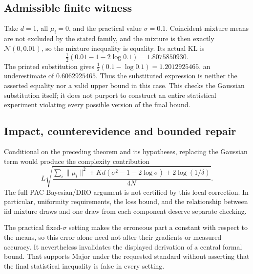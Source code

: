 \documentclass[10pt]{article}
\begin{document}
\subsection*{Admissible finite witness}
Take \(d=1\), all \(\mu_i=0\), and the practical value \(\sigma=0.1\). Coincident mixture means are not excluded by the stated family, and the mixture is then exactly \(\mathcal N(0,0.01)\), so the mixture inequality is equality. Its actual KL is \[\tfrac12(0.01-1-2\log0.1)=1.8075850930.\] The printed substitution gives \(\tfrac12(0.1-\log0.1)=1.2012925465\), an underestimate of \(0.6062925465\). Thus the substituted expression is neither the asserted equality nor a valid upper bound in this case. This checks the Gaussian substitution itself; it does not purport to construct an entire statistical experiment violating every possible version of the final bound.\par
\subsection*{Impact, counterevidence and bounded repair}
Conditional on the preceding theorem and its hypotheses, replacing the Gaussian term would produce the complexity contribution \[L\sqrt{\frac{\sum_i\|\mu_i\|^2+
       Kd(\sigma^2-1-2\log\sigma)+2\log(1/\delta)}{4N}}.\] The full PAC-Bayesian/DRO argument is not certified by this local correction. In particular, uniformity requirements, the loss bound, and the relationship between iid mixture draws and one draw from each component deserve separate checking.\par
The practical fixed-\(\sigma\) setting makes the erroneous part a constant with respect to the means, so this error alone need not alter their gradients or measured accuracy. It nevertheless invalidates the displayed derivation of a central formal bound. That supports Major under the requested standard without asserting that the final statistical inequality is false in every setting.\par
\end{document}
